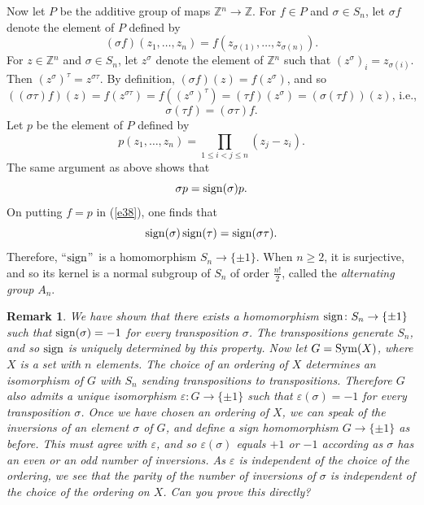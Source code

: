 \documentclass[a4paper,11pt,final,openany]{memoir}%
\newtheorem{remark}[X]{Remark}
\theoremstyle{nonumberplain}
\begin{document}
Now let $P$ be the additive group of maps $\mathbb{Z}{}^{n}\rightarrow
\mathbb{Z}{}$. For $f\in P$ and $\sigma\in S_{n}$, let $\sigma f$ denote the
element of $P$ defined by%
\[
(\sigma f)(z_{1},\ldots,z_{n})=f(z_{\sigma(1)},\ldots,z_{\sigma(n)}).
\]
For $z\in\mathbb{Z}{}^{n}$ and $\sigma\in S_{n}$, let $z^{\sigma}$ denote the
element of $\mathbb{Z}{}^{n}$ such that $(z^{\sigma})_{i}=z_{\sigma(i)}$. Then
$(z^{\sigma})^{\tau}=z^{\sigma\tau}$. By definition, $(\sigma
f)(z)=f(z^{\sigma})$, and so $\left(  (\sigma\tau)f\right)  (z)=f(z^{\sigma
\tau})=f((z^{\sigma})^{\tau})=(\tau f)(z^{\sigma})=(\sigma(\tau f))(z)$,
i.e.,
\begin{equation}
\sigma(\tau f)=(\sigma\tau)f. \label{e38}%
\end{equation}
Let $p$ be the element of $P$ defined by%
\[
p(z_{1},\ldots,z_{n})=\prod_{1\leq i<j\leq n}(z_{j}-z_{i}).
\]
The same argument as above shows that%
\[
\sigma p=\operatorname{sign}(\sigma)p.
\]
On putting $f=p$ in (\ref{e38}), one finds that%
\[
\operatorname{sign}(\sigma)\operatorname{sign}(\tau)=\operatorname{sign}(\sigma\tau).
\]
Therefore, \textquotedblleft$\operatorname{sign}$\textquotedblright\ is a homomorphism
$S_{n}\rightarrow\{\pm1\}$. When $n\geq2$, it is surjective, and so its kernel
is a normal subgroup of $S_{n}$ of order $\frac{n!}{2}$, called the
\emph{alternating group}%
%
%
$A_{n}$.

\begin{remark}
\label{ga22a}We have shown that there exists a homomorphism $\operatorname{sign}\colon
S_{n}\rightarrow\{\pm1\}$ such that $\operatorname{sign}(\sigma)=-1$ for every transposition
$\sigma$. The transpositions generate $S_{n}$, and so $\operatorname{sign}$ is uniquely
determined by this property. Now let $G=\operatorname{Sym}(X)$, where $X$ is a set with $n$
elements. The choice of an ordering of $X$ determines an isomorphism of $G$
with $S_{n}$ sending transpositions to transpositions. Therefore $G$ also
admits a unique isomorphism $\varepsilon\colon G\rightarrow\{\pm1\}$ such that
$\varepsilon(\sigma)=-1$ for every transposition $\sigma$. Once we have chosen
an ordering of $X$, we can speak of the inversions of an element $\sigma$ of
$G$, and define a sign homomorphism $G\to\{\pm1\}$ as before. This must agree
with $\varepsilon$, and so $\varepsilon(\sigma)$ equals $+1$ or $-1$ according
as $\sigma$ has an even or an odd number of inversions. As $\varepsilon$ is
independent of the choice of the ordering, we see that the parity of the
number of inversions of $\sigma$ is independent of the choice of the ordering
on $X$. Can you prove this directly?
\end{remark}
\end{document}
